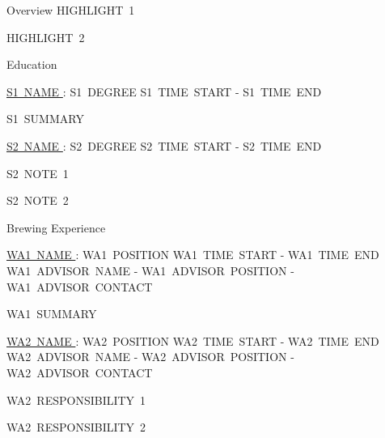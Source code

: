 \documentclass{resume} %
\begin{document}
  

  \begin{rSection}{Overview}
    HIGHLIGHT~1

    HIGHLIGHT~2
  \end{rSection}

  \begin{rSection}{Education}

    \begin{rSubsection}{\underline{S1~NAME }: S1~DEGREE }{ S1~TIME~START - S1~TIME~END }{}

      \item S1~SUMMARY

    \end{rSubsection}
    
    \begin{rSubsection}{\underline{S2~NAME }: S2~DEGREE }{ S2~TIME~START - S2~TIME~END }{}

      \item S2~NOTE~1

      \item S2~NOTE~2

    \end{rSubsection}

  \end{rSection}

  \begin{rSection}{Brewing Experience}

    \begin{rSubsection}{\underline{WA1~NAME }: WA1~POSITION }{ WA1~TIME~START - WA1~TIME~END }{ WA1~ADVISOR~NAME - WA1~ADVISOR~POSITION - WA1~ADVISOR~CONTACT }

      \item WA1~SUMMARY

    \end{rSubsection}

    \begin{rSubsection}{\underline{WA2~NAME }: WA2~POSITION }{ WA2~TIME~START - WA2~TIME~END }{ WA2~ADVISOR~NAME - WA2~ADVISOR~POSITION - WA2~ADVISOR~CONTACT }

      \item WA2~RESPONSIBILITY~1

      \item WA2~RESPONSIBILITY~2
      

    \end{rSubsection}

  \end{rSection}
\end{document}
